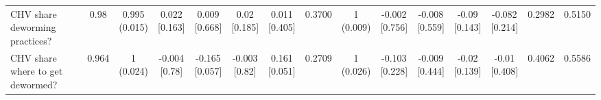 {\begin{tabular}[t]{lcccccccccccccc}
\hspace{1em}CHV share deworming practices? & 0.98 & \makecell[c]{0.995\\(0.015)} & \makecell[c]{0.022\\{[0.163]}} & \makecell[c]{0.009\\{[0.668]}} & \makecell[c]{0.02\\{[0.185]}} & \makecell[c]{0.011\\{[0.405]}} & 0.3700 & \makecell[c]{1\\(0.009)} & \makecell[c]{-0.002\\{[0.756]}} & \makecell[c]{-0.008\\{[0.559]}} & \makecell[c]{-0.09\\{[0.143]}} & \makecell[c]{-0.082\\{[0.214]}} & 0.2982 & 0.5150\\
\hspace{1em}CHV share where to get dewormed? & 0.964 & \makecell[c]{1\\(0.024)} & \makecell[c]{-0.004\\{[0.78]}} & \makecell[c]{-0.165\\{[0.057]}} & \makecell[c]{-0.003\\{[0.82]}} & \makecell[c]{0.161\\{[0.051]}} & 0.2709 & \makecell[c]{1\\(0.026)} & \makecell[c]{-0.103\\{[0.228]}} & \makecell[c]{-0.009\\{[0.444]}} & \makecell[c]{-0.02\\{[0.139]}} & \makecell[c]{-0.01\\{[0.408]}} & 0.4062 & 0.5586\\
\bottomrule
\end{tabular}}

